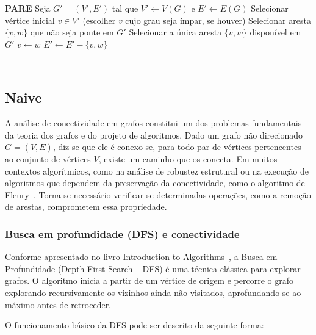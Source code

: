 \documentclass{sbc2023}%
\begin{document}
\begin{algorithm}[H]
\caption{Método de Fleury}
\label{alg:fleury}
\begin{algorithmic}[1] %
    \State \textbf{PARE}
\EndIf
\State Seja $G' = (V', E')$ tal que $V' \leftarrow V(G)$ e $E' \leftarrow E(G)$ 
\State Selecionar vértice inicial $v \in V'$ (escolher $v$ cujo grau seja ímpar, se houver)
        \State Selecionar aresta $\{v, w\}$ que não seja ponte em $G'$
    \Else
        \State Selecionar a única aresta $\{v, w\}$ disponível em $G'$
    \EndIf
    \State $v \leftarrow w$
    \State $E' \leftarrow E' - \{v, w\}$ 
\EndWhile
\end{algorithmic}
\end{algorithm} ~\citep{slide}



\subsection{Naive}
A análise de conectividade em grafos constitui um dos problemas fundamentais da teoria dos grafos e do projeto de algoritmos. Dado um grafo não direcionado $G = (V,E)$, diz-se que ele é conexo se, para todo par de vértices pertencentes ao conjunto de vértices $V$, existe um caminho que os conecta. Em muitos contextos algorítmicos, como na análise de robustez estrutural ou na execução de algoritmos que dependem da preservação da conectividade, como o algoritmo de Fleury~\citep{AlgoFleury}. Torna-se necessário verificar se determinadas operações, como a remoção de arestas, comprometem essa propriedade.

\subsubsection{Busca em profundidade (DFS) e conectividade}

Conforme apresentado no livro Introduction to Algorithms~\citep{cormen2022Naive}, a Busca em Profundidade (Depth-First Search – DFS) é uma técnica clássica para explorar grafos. O algoritmo inicia a partir de um vértice de origem e percorre o grafo explorando recursivamente os vizinhos ainda não visitados, aprofundando-se ao máximo antes de retroceder.

O funcionamento básico da DFS pode ser descrito da seguinte forma:
\end{document}
